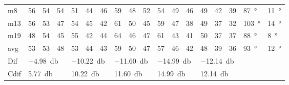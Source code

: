 \begin{table}[H]
\begin{tabular}{l|l|l|l|l|l|l|l|l|l|l|l|l|l|l|l|l|l}
m8    &  56    &  54    & 54     &  51    &  44    &   46   &   59   &   48    &  52    &   54    &    49  &   46   & 49 & 42 & 39 & \SI{87}{\degree} & \SI{11}{\degree}  \\
m13  &   56   & 53     &   47   & 54     &   45   &   42   &   61   &   50    &  45    &   59    &   47   &   38   & 49 & 37 & 32 &  \SI{103}{\degree} & \SI{14}{\degree} \\
m19  &  48    &  54    &  45    &  55    &  42    &   44   &   64   &    46   &  47    &   61    &   43   &    41  & 50 & 37 & 37 &  \SI{88}{\degree} & \SI{8}{\degree} \\ \hline
avg &  53    &   53   &  48    &  53    &  44    & 43     &  59    &   50    & 47     &   57    & 46     &   42   & 48 & 39  &36 &  \SI{93}{\degree} & \SI{12}{\degree} \\ \hline  
Dif & \multicolumn{3}{l|}{\SI{-4.98}{\decibel}} & \multicolumn{3}{l|}{\SI{-10.22}{\decibel}} & \multicolumn{3}{l|}{\SI{-11.60}{\decibel}} & \multicolumn{3}{l|}{\SI{-14.99}{\decibel}} &  \multicolumn{3}{l|}{\SI{-12.14}{\decibel}}    &  \multicolumn{2}{l}{}   \\ \hline 
Cdif & \multicolumn{3}{l|}{\SI{5.77}{\decibel}} & \multicolumn{3}{l|}{\SI{10.22}{\decibel}} & \multicolumn{3}{l|}{\SI{11.60}{\decibel}} & \multicolumn{3}{l|}{\SI{14.99}{\decibel}} & \multicolumn{3}{l|}{\SI{12.14}{\decibel}}  &   \multicolumn{2}{l}{}                           
\end{tabular}
\label{meas:result_cross_6_7}
\end{table}



